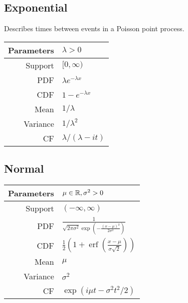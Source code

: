 \documentclass[12pt]{article}
\begin{document}
\subsection{Exponential}
Describes times between events in a Poisson point process.
\begin{center}
\def\arraystretch{1.5}
\begin{tabular}{|r|l|} \hline
    Parameters & \( \lambda > 0 \) \\ \hline
    Support & \( [0,\infty) \) \\ \hline
    PDF & \( \lambda e^{-\lambda x} \) \\ \hline 
    CDF & \( 1-e^{- \lambda x} \) \\ \hline
    Mean & \( 1/\lambda \) \\ \hline
    Variance & \( 1/\lambda^2 \) \\ \hline
    CF & \( \lambda/(\lambda-it) \)\\ \hline
\end{tabular}
\end{center}

\subsection{Normal}
\begin{center}
\def\arraystretch{1.5}
\begin{tabular}{|r|l|} \hline
    Parameters & \( \mu\in\mathbb{R}, \sigma^2 > 0 \) \\ \hline
    Support & \( (-\infty,\infty) \) \\ \hline
    PDF & \( \frac{1}{\sqrt{2\pi \sigma^2} \exp \left( - \frac{(x-\mu)^2}{2\sigma^2} \right)} \) \\ \hline 
    CDF & \( \frac{1}{2} \left( 1+\operatorname{erf} \left( \frac{x-\mu}{\sigma\sqrt{2}} \right) \right) \) \\ \hline
    Mean & \( \mu \) \\ \hline
    Variance & \( \sigma^2 \) \\ \hline
    CF & \( \exp \left( i \mu t  - \sigma^2 t^2/2 \right) \)\\ \hline
\end{tabular}
\end{center}
\end{document}
